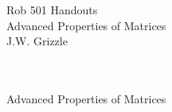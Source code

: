 \documentclass[12pt,letterpaper,headings=normal]{scrartcl}
\begin{document}


\baselineskip=48pt  %

%

\pagestyle{plain}

\vspace*{7cm}


\begin{center}
{\Large 
Rob 501 Handouts \\
Advanced Properties of Matrices
\mbox{ } \\
J.W. Grizzle \\
\mbox{ } \\
\mbox{ } 
}
\end{center}



\newpage
\vspace*{10cm}
{\Large 
\begin{center}
Advanced Properties of Matrices \\
\mbox{ } \\
\end{center}
}
\newpage
\end{document}
